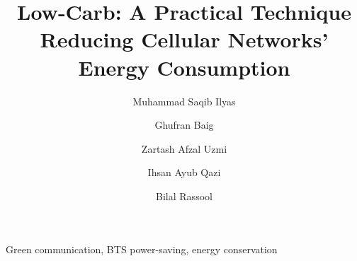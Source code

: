 \documentclass[preprint,12pt]{elsarticle}
\begin{document}
\begin{frontmatter}



\title{Low-Carb: A Practical Technique Reducing Cellular Networks' Energy Consumption}


\author[LUMS]{Muhammad Saqib Ilyas}
\author[LUMS]{Ghufran Baig}
\author[LUMS]{Zartash Afzal Uzmi}
\author[LUMS]{Ihsan Ayub Qazi}
\author[WaridTel]{Bilal Rassool}
\address[LUMS]{School of Science and Engineering, LUMS, Lahore, Pakistan}
\address[WaridTel]{Warid Telecom, Lahore, Pakistan}




\begin{keyword}

Green communication, BTS power-saving, energy conservation
\end{keyword}

\end{frontmatter}








\end{document}
